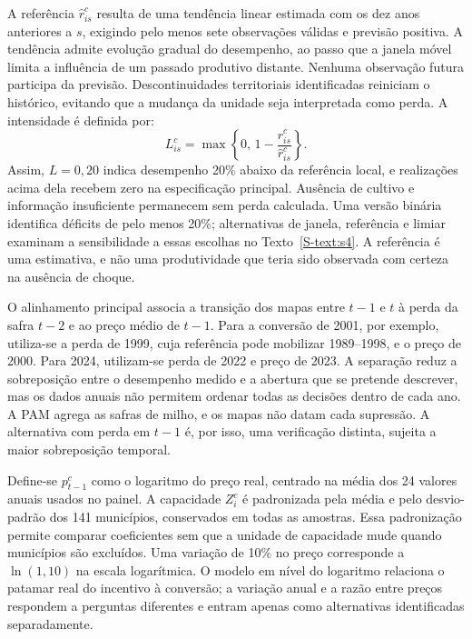 A referência $\widehat r^c_{is}$ resulta de uma tendência linear estimada com os dez anos anteriores a $s$, exigindo pelo menos sete observações válidas e previsão positiva. A tendência admite evolução gradual do desempenho, ao passo que a janela móvel limita a influência de um passado produtivo distante. Nenhuma observação futura participa da previsão. Descontinuidades territoriais identificadas reiniciam o histórico, evitando que a mudança da unidade seja interpretada como perda. A intensidade é definida por:
\begin{equation}
L^c_{is}=\max\left\{0,\,1-\frac{r^c_{is}}{\widehat r^c_{is}}\right\}.
\label{eq:perda}
\end{equation}
Assim, $L=0,20$ indica desempenho 20\% abaixo da referência local, e realizações acima dela recebem zero na especificação principal. Ausência de cultivo e informação insuficiente permanecem sem perda calculada. Uma versão binária identifica déficits de pelo menos 20\%; alternativas de janela, referência e limiar examinam a sensibilidade a essas escolhas no Texto~\ref{S-text:s4}. A referência é uma estimativa, e não uma produtividade que teria sido observada com certeza na ausência de choque.

O alinhamento principal associa a transição dos mapas entre $t-1$ e $t$ à perda da safra $t-2$ e ao preço médio de $t-1$. Para a conversão de 2001, por exemplo, utiliza-se a perda de 1999, cuja referência pode mobilizar 1989--1998, e o preço de 2000. Para 2024, utilizam-se perda de 2022 e preço de 2023. A separação reduz a sobreposição entre o desempenho medido e a abertura que se pretende descrever, mas os dados anuais não permitem ordenar todas as decisões dentro de cada ano. A PAM agrega as safras de milho, e os mapas não datam cada supressão. A alternativa com perda em $t-1$ é, por isso, uma verificação distinta, sujeita a maior sobreposição temporal.

Define-se $p^c_{t-1}$ como o logaritmo do preço real, centrado na média dos 24 valores anuais usados no painel. A capacidade $Z^c_i$ é padronizada pela média e pelo desvio-padrão dos 141 municípios, conservados em todas as amostras. Essa padronização permite comparar coeficientes sem que a unidade de capacidade mude quando municípios são excluídos. Uma variação de 10\% no preço corresponde a $\ln(1,10)$ na escala logarítmica. O modelo em nível do logaritmo relaciona o patamar real do incentivo à conversão; a variação anual e a razão entre preços respondem a perguntas diferentes e entram apenas como alternativas identificadas separadamente.

